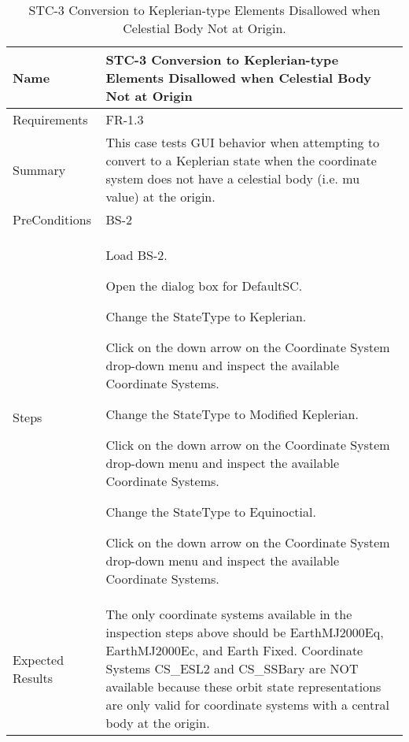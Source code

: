\begin{table}[htbp!]
\centering
      \begin{tabular}{|p{1.05 in} |p{4.75 in} |}
      \hline
         \rowcolor[rgb]{0.8,0.8,0.8} Name & STC-3 Conversion to Keplerian-type Elements Disallowed when Celestial Body Not at Origin\\
         \hline
         Requirements & FR-1.3\\  \hline
         Summary &
         This  case tests GUI behavior when attempting to convert to a Keplerian state
         when the coordinate system does not have a celestial body (i.e. mu value) at the origin.
         \\     \hline
         PreConditions & BS-2\\     \hline
         Steps &
         \begin{compactenum}
             \item Load BS-2.
             \item Open the dialog box for DefaultSC.
             \item Change the StateType to Keplerian.
             \item Click on the down arrow on the Coordinate System drop-down menu and inspect the available Coordinate Systems.
             \item Change the StateType to Modified Keplerian.
             \item Click on the down arrow on the Coordinate System drop-down menu and inspect the available Coordinate Systems.
             \item Change the StateType to Equinoctial.
             \item Click on the down arrow on the Coordinate System drop-down menu and inspect the available Coordinate Systems.
         \end{compactenum}
         \\ \hline
         Expected Results & The only coordinate systems available in the inspection steps above should be EarthMJ2000Eq, EarthMJ2000Ec, and Earth Fixed.   Coordinate Systems CS\_ESL2  and  CS\_SSBary are NOT available because these orbit state representations are only valid for coordinate systems with a central body at the origin.\\
      \hline
\end{tabular}
      \label{Table: STC-3}
      \caption{STC-3 Conversion to Keplerian-type Elements Disallowed when Celestial Body Not at Origin.  }
\end{table} 